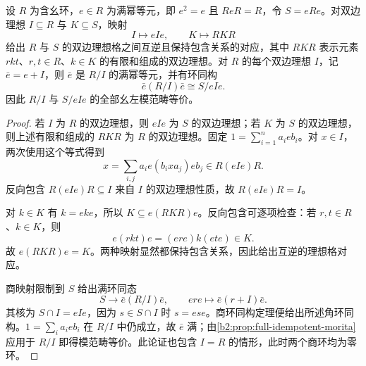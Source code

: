 \begin{proposition}[满角环的双边理想对应]\label{b2:prop:full-corner-ideal-correspondence}
	设 \(R\) 为含幺环，\(e\in R\) 为满幂等元，即 \(e^2=e\) 且 \(ReR=R\)，令 \(S=eRe\)。对双边理想 \(I\subseteq R\) 与 \(K\subseteq S\)，映射
	\[
		I\longmapsto eIe,\qquad K\longmapsto RKR
	\]
	给出 \(R\) 与 \(S\) 的双边理想格之间互逆且保持包含关系的对应，其中 \(RKR\) 表示元素 \(rkt\)、\(r,t\in R\)、\(k\in K\) 的有限和组成的双边理想。对 \(R\) 的每个双边理想 \(I\)，记 \(\bar e=e+I\)，则 \(\bar e\) 是 \(R/I\) 的满幂等元，并有环同构
	\[
		\bar e(R/I)\bar e\cong S/eIe.
	\]
	因此 \(R/I\) 与 \(S/eIe\) 的全部幺左模范畴等价。
\end{proposition}
\begin{proof}
	若 \(I\) 为 \(R\) 的双边理想，则 \(eIe\) 为 \(S\) 的双边理想；若 \(K\) 为 \(S\) 的双边理想，则上述有限和组成的 \(RKR\) 为 \(R\) 的双边理想。固定 \(1=\sum_{i=1}^n a_i e b_i\)。对 \(x\in I\)，两次使用这个等式得到
	\[
		x=\sum_{i,j}a_i e(b_i x a_j)e b_j\in R(eIe)R.
	\]
	反向包含 \(R(eIe)R\subseteq I\) 来自 \(I\) 的双边理想性质，故 \(R(eIe)R=I\)。

	对 \(k\in K\) 有 \(k=eke\)，所以 \(K\subseteq e(RKR)e\)。反向包含可逐项检查：若 \(r,t\in R\)、\(k\in K\)，则
	\[
		e(rkt)e=(ere)k(ete)\in K.
	\]
	故 \(e(RKR)e=K\)。两种映射显然都保持包含关系，因此给出互逆的理想格对应。

	商映射限制到 \(S\) 给出满环同态
	\[
		S\longrightarrow\bar e(R/I)\bar e,\qquad ere\longmapsto\bar e(r+I)\bar e.
	\]
	其核为 \(S\cap I=eIe\)，因为 \(s\in S\cap I\) 时 \(s=ese\)。商环同构定理便给出所述角环同构。\(1=\sum_i a_i e b_i\) 在 \(R/I\) 中仍成立，故 \(\bar e\) 满；由\cref{b2:prop:full-idempotent-morita}应用于 \(R/I\) 即得模范畴等价。此论证也包含 \(I=R\) 的情形，此时两个商环均为零环。
\end{proof}
